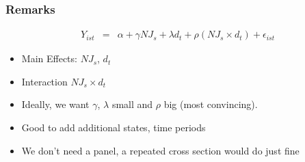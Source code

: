 \documentclass[notes=show,beamer,compress]{beamer}
\begin{document}




\begin{frame}
\frametitle{Remarks}

 \begin{eqnarray*}
Y_{ist}&=& \alpha + \gamma NJ_{s}+ \lambda d_{t}+ \rho ( NJ_{s}\times d_{t})+ \epsilon_{ist}
 \end{eqnarray*}

\begin {itemize}
\item Main Effects: $NJ_{s}$,  $d_{t}$
\item Interaction $NJ_{s} \times d_{t}$
\item Ideally, we want $\gamma$, $\lambda$ small and $\rho$ big (most convincing).
\item Good to add additional states, time periods
\item{We don't need a panel, a repeated cross section would do just fine}
\end {itemize}
\end{frame}
\end{document}
